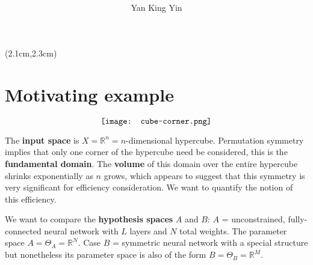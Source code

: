 \begin{preview}

\title{\vspace{-1.5cm} \bfseries{}}

\author{Yan King Yin} %

\maketitle

\setcounter{section}{-1}
\setcounter{mypage}{0}

\begin{textblock*}{5cm}(2.1cm,2.3cm) %
{\color{red}{\large \textcircled{\small \themypage}}}
\addtocounter{mypage}{1}
\end{textblock*}

\begin{minipage}{\textwidth}
\setlength{\parskip}{0.4\baselineskip}

\section{Motivating example}

\begin{equation}
\vcenter{\hbox{\texttt{[image: cube-corner.png]}}}
\end{equation}

The \textbf{input space} is $X = \mathbb{R}^n = n$-dimensional hypercube.  Permutation symmetry implies that only one corner of the hypercube need be considered, this is the \textbf{fundamental domain}.  The \textbf{volume} of this domain over the entire hypercube shrinks exponentially as $n$ grows, which appears to suggest that this symmetry is very significant for efficiency consideration.  We want to quantify the notion of this efficiency.

We want to compare the \textbf{hypothesis spaces} $A$ and $B$:  $A$ = unconstrained, fully-connected neural network with $L$ layers and $N$ total weights.  The parameter space $A = \Theta_A = \mathbb{R}^N$.  Case $B$ = symmetric neural network with a special structure but nonetheless its parameter space is also of the form $B = \Theta_B = \mathbb{R}^M$.


\end{minipage}
\end{preview}

